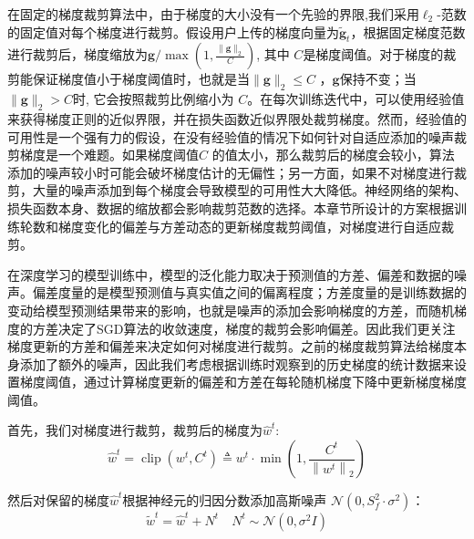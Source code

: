 在固定的梯度裁剪算法中，由于梯度的大小没有一个先验的界限,我们采用$\ell_{2}$-范数的固定值对每个梯度进行裁剪。假设用户上传的梯度向量为$\tilde{\mathbf{g}}_{t}$，根据固定梯度范数进行裁剪后，梯度缩放为$\mathbf{g} / \max \left(1, \frac{\|\mathbf{g}\|_{2}}{C}\right)$, 其中 $C$是梯度阈值。对于梯度的裁剪能保证梯度值小于梯度阈值时，也就是当$\|\mathbf{g}\|_{2} \leq C$ ，$\mathbf{g}$保持不变；当$\|\mathbf{g}\|_{2}>C$时, 它会按照裁剪比例缩小为 $C$。在每次训练迭代中，可以使用经验值来获得梯度正则的近似界限，并在损失函数近似界限处裁剪梯度。然而，经验值的可用性是一个强有力的假设，在没有经验值的情况下如何针对自适应添加的噪声裁剪梯度是一个难题。如果梯度阈值$C$ 的值太小，那么裁剪后的梯度会较小，算法添加的噪声较小时可能会破坏梯度估计的无偏性；另一方面，如果不对梯度进行裁剪，大量的噪声添加到每个梯度会导致模型的可用性大大降低。神经网络的架构、损失函数本身、数据的缩放都会影响裁剪范数的选择。本章节所设计的方案根据训练轮数和梯度变化的偏差与方差动态的更新梯度裁剪阈值，对梯度进行自适应裁剪。


在深度学习的模型训练中，模型的泛化能力取决于预测值的方差、偏差和数据的噪声。偏差度量的是模型预测值与真实值之间的偏离程度；方差度量的是训练数据的变动给模型预测结果带来的影响，也就是噪声的添加会影响梯度的方差，而随机梯度的方差决定了SGD算法的收敛速度，梯度的裁剪会影响偏差。因此我们更关注梯度更新的方差和偏差来决定如何对梯度进行裁剪。之前的梯度裁剪算法给梯度本身添加了额外的噪声，因此我们考虑根据训练时观察到的历史梯度的统计数据来设置梯度阈值，通过计算梯度更新的偏差和方差在每轮随机梯度下降中更新梯度梯度阈值。

首先，我们对梯度进行裁剪，裁剪后的梯度为$\hat{w}^{t}$:
\begin{equation}
\hat{w}^{t}=\operatorname{clip}\left(w^{t}, C^{t}\right) \triangleq w^{t} \cdot \min \left(1, \frac{C^{t}}{\left\|w^{t}\right\|_{2}}\right)
\end{equation}

然后对保留的梯度$\hat{w}^{t}$根据神经元的归因分数添加高斯噪声 $\mathcal{N}\left(0, S_{f}^{2} \cdot \sigma^{2}\right)$：
\begin{equation}
\tilde{w}^{t}=\hat{w}^{t}+N^{t} \quad N^{t} \sim \mathcal{N}\left(0, \sigma^{2} I\right)
\end{equation}

